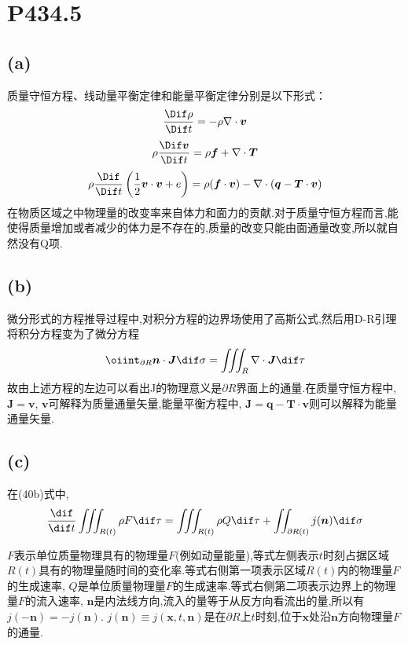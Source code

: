 \documentclass[12pt]{article}
\begin{document}
\section{P434.5}

\subsection{(a)}

质量守恒方程、线动量平衡定律和能量平衡定律分别是以下形式：
\begin{equation}
	\frac{\Dif \rho}{\Dif t} = -\rho\nabla\cdot \bm{v}
\end{equation}
\begin{equation}
	\rho\frac{\Dif \bm{v}}{\Dif t} = \rho \bm{f} + \nabla\cdot \bm{T}
\end{equation}
\begin{equation}
	\rho\frac{\Dif }{\Dif t}\left(\frac{1}{2}\bm{v}\cdot \bm{v}+e\right) = \rho(\bm{f}\cdot \bm{v})-\nabla\cdot(\bm{q}-\bm{T}\cdot \bm{v})
\end{equation}
在物质区域之中物理量的改变率来自体力和面力的贡献.对于质量守恒方程而言,能使得质量增加或者减少的体力是不存在的,质量的改变只能由面通量改变,所以就自然没有Q项.

\subsection{(b)}

微分形式的方程推导过程中,对积分方程的边界场使用了高斯公式,然后用D-R引理将积分方程变为了微分方程
\begin{equation}
	\oiint_{\partial R}\bm{n}\cdot \bm{J} \dif \sigma = \iiint_{R}\nabla\cdot \bm{J}\dif \tau
\end{equation}
故由上述方程的左边可以看出J的物理意义是$\partial R$界面上的通量.在质量守恒方程中, $\bm{J}=\bm{v}$, $\bm{v}$可解释为质量通量矢量,能量平衡方程中, $\bm{J} = \bm{q}-\bm{T}\cdot \bm{v}$则可以解释为能量通量矢量.

\subsection{(c)}

在(40b)式中,
\begin{equation}
	\frac{\dif }{\dif t}\iiint_{R(t)}\rho F\dif \tau = 
\iiint_{R(t)}\rho Q\dif \tau + \iint_{\partial R(t)}j(\bm{n}) \dif \sigma
\end{equation}

$F$表示单位质量物理具有的物理量$F$(例如动量能量),等式左侧表示$t$时刻占据区域$R(t)$具有的物理量随时间的变化率.等式右侧第一项表示区域$R(t)$内的物理量$F$的生成速率, $Q$是单位质量物理量$F$的生成速率.等式右侧第二项表示边界上的物理量$F$的流入速率, $\bm{n}$是内法线方向,流入的量等于从反方向看流出的量,所以有$j(-\bm{n})=-j(\bm{n})$. $j(\bm{n})\equiv j(\bm{x},t,\bm{n})$是在$\partial R$上$t$时刻,位于$\bm{x}$处沿$\bm{n}$方向物理量$F$的通量.

\nocite{*}


\end{document}
